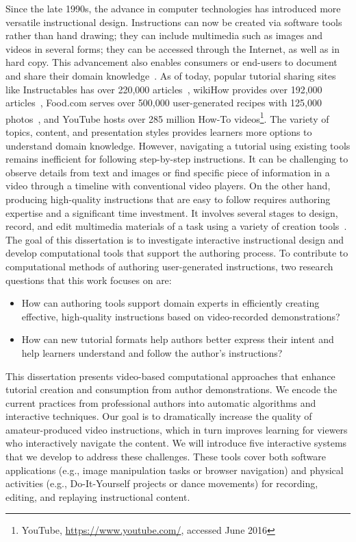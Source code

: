 Since the late 1990s, the advance in computer technologies has introduced more versatile instructional design. Instructions can now be created via software tools rather than hand drawing; they can include multimedia such as images and videos in several forms; they can be accessed through the Internet, as well as in hard copy.
%
This advancement also enables consumers or end-users to document and share their domain knowledge~\cite{Lafreniere:2012tl}. As of today, popular tutorial sharing sites like Instructables has over 220,000 articles~\cite{InstructablesProjects}, wikiHow provides over 192,000 articles~\cite{wikiHowStatistics}, Food.com serves over 500,000 user-generated recipes with 125,000 photos~\cite{FoodComAbout}, and YouTube hosts over 285 million How-To videos\footnote{YouTube, \url{https://www.youtube.com/}, accessed June 2016}.
%
The variety of topics, content, and presentation styles provides learners more options to understand domain knowledge.
%
However, navigating a tutorial using existing tools remains inefficient for following step-by-step instructions. It can be challenging to observe details from text and images or find specific piece of information in a video through a timeline with conventional video players.
%
On the other hand, producing high-quality instructions that are easy to follow requires authoring expertise and a significant time investment. It involves several stages to design, record, and edit multimedia materials of a task using a variety of creation tools~\cite{Torrey:2007he,Tseng:2014:PVP:2598510.2598540,Muller:2009tw}.\\

The goal of this dissertation is to investigate interactive instructional design and develop computational tools that support the authoring process.
%
To contribute to computational methods of authoring user-generated instructions, two research questions that this work focuses on are:

\begin{itemize}
  \item How can authoring tools support domain experts in efficiently creating effective, high-quality instructions based on video-recorded demonstrations?
  \item How can new tutorial formats help authors better express their intent and help learners understand and follow the author's instructions?
\end{itemize}

This dissertation presents video-based computational approaches that enhance tutorial creation and consumption from author demonstrations.
We encode the current practices from professional authors into automatic algorithms and interactive techniques.
Our goal is to dramatically increase the quality of amateur-produced video instructions, which in turn improves learning for viewers who interactively navigate the content.
%
We will introduce five interactive systems that we develop to address these challenges. These tools cover both software applications (e.g., image manipulation tasks or browser navigation) and physical activities (e.g., Do-It-Yourself projects or dance movements) for recording, editing, and replaying instructional content.

